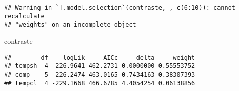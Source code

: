 \documentclass[
]{article}
\newenvironment{Shaded}{\begin{snugshade}}{\end{snugshade}}
\newcommand{\NormalTok}[1]{#1}
\begin{document}
\begin{verbatim}
## Warning in `[.model.selection`(contraste, , c(6:10)): cannot recalculate
## "weights" on an incomplete object
\end{verbatim}

\begin{Shaded}
\begin{Highlighting}[]
\NormalTok{contraste}
\end{Highlighting}
\end{Shaded}

\begin{verbatim}
##        df    logLik     AICc     delta     weight
## tempsh  4 -226.9641 462.2731 0.0000000 0.55553752
## comp    5 -226.2474 463.0165 0.7434163 0.38307393
## tempcl  4 -229.1668 466.6785 4.4054254 0.06138856
\end{verbatim}
\end{document}
